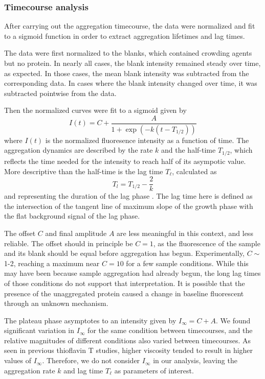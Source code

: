 \subsubsection{Timecourse analysis}

After carrying out the aggregation timecourse, the data were normalized and fit to a sigmoid function in order to extract aggregation lifetimes and lag times.

The data were first normalized to the blanks, which contained crowding agents but no protein.  In nearly all cases, the blank intensity remained steady over time, as expected.  In those cases, the mean blank intensity was subtracted from the corresponding data.  In cases where the blank intensity changed over time, it was subtracted pointwise from the data.

Then the normalized curves were fit to a sigmoid given by
\begin{equation}
I(t) = C + \frac{A}{1+\exp \left(-k(t-T_{1/2})\right)}
\label{eq:sig-fit}
\end{equation}
where $I(t)$ is the normalized fluoresence intensity as a function of time.  The aggregation dynamics are described by the rate $k$ and the half-time $T_{1/2}$, which reflects the time needed for the intensity to reach half of its asympotic value.  More descriptive than the half-time is the lag time $T_\ell$, calculated as
\begin{equation}
T_l = T_{1/2} - \frac{2}{k}
\end{equation}
and representing the duration of the lag phase \cite{arosio15}.  The lag time here is defined as the intersection of the tangent line of maximum slope of the growth phase with the flat background signal of the lag phase.  

The offset $C$ and final amplitude $A$ are less meaningful in this context, and less reliable.  The offset should in principle be $C=1$, as the fluorescence of the sample and its blank should be equal before aggregation has begun.   Experimentally, $C \sim$ 1-2, reaching a maximum near $C= 10$ for a few sample conditions.  While this may have been because sample aggregation had already begun, the long lag times of those conditions do not support that interpretation.  It is possible that the presence of the unaggregated protein caused a change in baseline fluorescent through an unknown mechanism.

The plateau phase asymptotes to an intensity given by $I_\infty=C+A$.  We found significant variation in $I_\infty$ for the same condition between timecourses, and the relative magnitudes of different conditions also varied between timecourses.  As seen in previous thioflavin T studies, higher viscosity tended to result in higher values of $I_\infty$. Therefore, we do not consider $I_\infty$ in our analysis, leaving the aggregation rate $k$ and lag time $T_\ell$ as parameters of interest.

